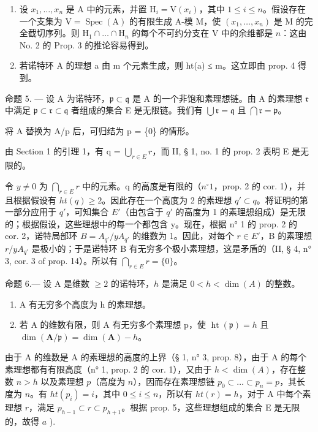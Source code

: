 \begin{enumerate}
\def\labelenumi{\arabic{enumi})}
\setcounter{enumi}{1}
\item
  设 \(x_1, \ldots, x_n\) 是 A 中的元素，并置 \(\mathrm{H}_i = \mathrm{V}(x_i)\)，其中 \(1 \leqslant i \leqslant n\)。假设存在一个支集为 \(\mathrm{V} = \operatorname{Spec}(\mathrm{A})\) 的有限生成 A-模 M，使 \((x_1, \ldots, x_n)\) 是 M 的完全截切序列。则 \(\mathrm{H}_1 \cap \ldots \cap \mathrm{H}_n\) 的每个不可约分支在 V 中的余维都是 \(n\)：这由 No. 2 的 Prop. 3 的推论容易得到。
\item
  若诺特环 A 的理想 a 由 m 个元素生成，则 ht(a) ≤ m。这立即由 prop. 4 得到。
\end{enumerate}

命题 5. --- 设 A 为诺特环，\(\mathfrak{p} \subset \mathfrak{q}\) 是 A 的一个非饱和素理想链。由 A 的素理想 \(\mathfrak{r}\) 中满足 \(\mathfrak{p} \subset \mathfrak{r} \subset \mathfrak{q}\) 者组成的集合 E 是无限链。我们有 \(\bigcup \mathfrak{r} = \mathfrak{q}\) 且 \(\bigcap \mathfrak{r} = \mathfrak{p}\)。

将 A 替换为 A/p 后，可归结为 p = \{0\} 的情形。

由 Section 1 的引理 1，有 q = \(\bigcup_{r \in E} r\)，而 II, § 1, no. 1 的 prop. 2 表明 E 是无限的。

令 \(y \neq 0\) 为 \(\bigcap_{r \in E} r\) 中的元素。q 的高度是有限的（\(n^{\circ}1\)，prop. 2 的 cor. 1），并且根据假设有 \(ht(q) \geqslant 2\)。因此存在一个高度为 2 的素理想 \(q' \subset q\)。将证明的第一部分应用于 \(q'\)，可知集合 \(E'\)（由包含于 \(q'\) 的高度为 1 的素理想组成）是无限的；根据假设，这些理想中的每一个都包含 y。现在，根据 n° 1 的 prop. 2 的 cor. 2，诺特局部环 \(B = A_{q'} / yA_{q'}\) 的维数为 1。因此，对每个 \(r \in E'\)，B 的素理想 \(r/yA_{q'}\) 是极小的；于是诺特环 B 有无穷多个极小素理想，这是矛盾的（II, § 4, n° 3, cor. 3 of prop. 14）。所以有 \(\bigcap_{r \in E} r = \{0\}\)。

命题 6.--- 设 A 是维数 \(\geqslant 2\) 的诺特环，\(h\) 是满足 \(0 < h < \dim(A)\) 的整数。

\begin{enumerate}
\def\labelenumi{\alph{enumi})}
\item
  A 有无穷多个高度为 h 的素理想。
\item
  若 A 的维数有限，则 A 有无穷多个素理想 p，使 \(\operatorname{ht}(\mathfrak{p}) = h\) 且 \(\dim(\mathbf{A}/\mathfrak{p}) = \dim(\mathbf{A}) - h\)。
\end{enumerate}

由于 A 的维数是 A 的素理想的高度的上界（§ 1, n° 3, prop. 8），由于 A 的每个素理想都有有限高度（n° 1, prop. 2 的 cor. 1），又由于 \(h < \dim(A)\)，存在整数 \(n > h\) 以及素理想 \(p\)（高度为 \(n\)），因而存在素理想链 \(p_0 \subset \ldots \subset p_n = p\)，其长度为 \(n\)。有 \(ht(p_i) = i\)，其中 \(0 \leqslant i \leqslant n\)，所以有 \(ht(r) = h\)，对于 A 中每个素理想 \(r\)，满足 \(p_{h-1} \subset r \subset p_{h+1}\)。根据 prop. 5，这些理想组成的集合 E 是无限的，故得 \(a\) ).

